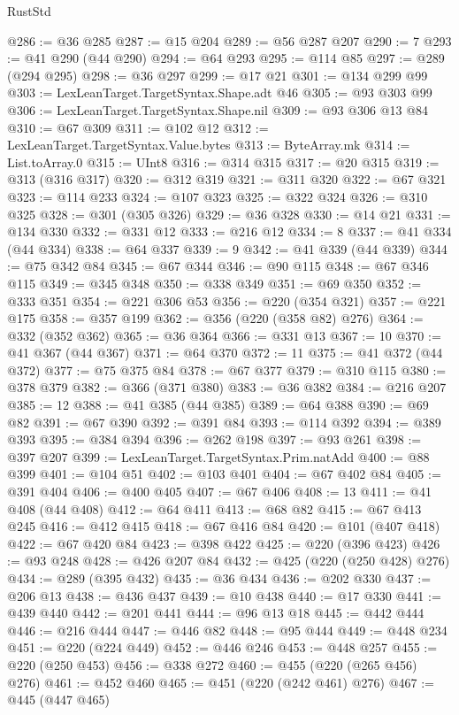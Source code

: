\begin{lexlean}{RustStd}
\begin{coremodule}
@286 := @36 @285
@287 := @15 @204
@289 := @56 @287 @207
@290 := 7
@293 := @41 @290 (@44 @290)
@294 := @64 @293
@295 := @114 @85
@297 := @289 (@294 @295)
@298 := @36 @297
@299 := @17 @21
@301 := @134 @299 @99
@303 := LexLeanTarget.TargetSyntax.Shape.adt @46
@305 := @93 @303 @99
@306 := LexLeanTarget.TargetSyntax.Shape.nil
@309 := @93 @306 @13 @84
@310 := @67 @309
@311 := @102 @12
@312 := LexLeanTarget.TargetSyntax.Value.bytes
@313 := ByteArray.mk
@314 := List.toArray.{0}
@315 := UInt8
@316 := @314 @315
@317 := @20 @315
@319 := @313 (@316 @317)
@320 := @312 @319
@321 := @311 @320
@322 := @67 @321
@323 := @114 @233
@324 := @107 @323
@325 := @322 @324
@326 := @310 @325
@328 := @301 (@305 @326)
@329 := @36 @328
@330 := @14 @21
@331 := @134 @330
@332 := @331 @12
@333 := @216 @12
@334 := 8
@337 := @41 @334 (@44 @334)
@338 := @64 @337
@339 := 9
@342 := @41 @339 (@44 @339)
@344 := @75 @342 @84
@345 := @67 @344
@346 := @90 @115
@348 := @67 @346 @115
@349 := @345 @348
@350 := @338 @349
@351 := @69 @350
@352 := @333 @351
@354 := @221 @306 @53
@356 := @220 (@354 @321)
@357 := @221 @175
@358 := @357 @199
@362 := @356 (@220 (@358 @82) @276)
@364 := @332 (@352 @362)
@365 := @36 @364
@366 := @331 @13
@367 := 10
@370 := @41 @367 (@44 @367)
@371 := @64 @370
@372 := 11
@375 := @41 @372 (@44 @372)
@377 := @75 @375 @84
@378 := @67 @377
@379 := @310 @115
@380 := @378 @379
@382 := @366 (@371 @380)
@383 := @36 @382
@384 := @216 @207
@385 := 12
@388 := @41 @385 (@44 @385)
@389 := @64 @388
@390 := @69 @82
@391 := @67 @390
@392 := @391 @84
@393 := @114 @392
@394 := @389 @393
@395 := @384 @394
@396 := @262 @198
@397 := @93 @261
@398 := @397 @207
@399 := LexLeanTarget.TargetSyntax.Prim.natAdd
@400 := @88 @399
@401 := @104 @51
@402 := @103 @401
@404 := @67 @402 @84
@405 := @391 @404
@406 := @400 @405
@407 := @67 @406
@408 := 13
@411 := @41 @408 (@44 @408)
@412 := @64 @411
@413 := @68 @82
@415 := @67 @413 @245
@416 := @412 @415
@418 := @67 @416 @84
@420 := @101 (@407 @418)
@422 := @67 @420 @84
@423 := @398 @422
@425 := @220 (@396 @423)
@426 := @93 @248
@428 := @426 @207 @84
@432 := @425 (@220 (@250 @428) @276)
@434 := @289 (@395 @432)
@435 := @36 @434
@436 := @202 @330
@437 := @206 @13
@438 := @436 @437
@439 := @10 @438
@440 := @17 @330
@441 := @439 @440
@442 := @201 @441
@444 := @96 @13 @18
@445 := @442 @444
@446 := @216 @444
@447 := @446 @82
@448 := @95 @444
@449 := @448 @234
@451 := @220 (@224 @449)
@452 := @446 @246
@453 := @448 @257
@455 := @220 (@250 @453)
@456 := @338 @272
@460 := @455 (@220 (@265 @456) @276)
@461 := @452 @460
@465 := @451 (@220 (@242 @461) @276)
@467 := @445 (@447 @465)

\end{coremodule}
\end{lexlean}
